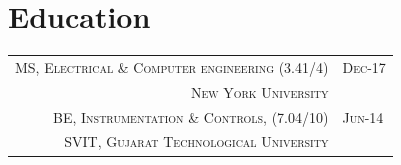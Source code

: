 \documentclass[a4paper]{article}
\begin{document}
\vspace{-0.5em} %

\section{\hfill\LARGE{\textbf{Education}}}


\begin{tabular}{rl}
\small{}	\textsc{	MS, Electrical \& Computer engineering \small {(3.41/4)}		} 	& 		\textsc{	Dec-17 	\faGraduationCap		}	\\
 		\textsc{	New York University \nyu\;		}	& 												\\
 \small{}	\textsc{	BE, Instrumentation \small{\&} Controls, \small {(7.04/10)}		} 	& 		\textsc{	Jun-14	\faGraduationCap		}	\\
 		\textsc{	SVIT, Gujarat Technological University					}	& 												\\
\end{tabular}




\vspace{-1em} %
\end{document}

